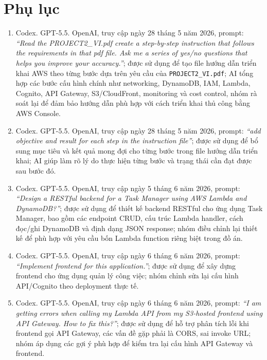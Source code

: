 \section{Phụ lục}

\begin{enumerate}
    \item Codex. GPT-5.5. OpenAI, truy cập ngày 28 tháng 5 năm 2026, prompt: \textit{``Read the PROJECT2\_VI.pdf create a step-by-step instruction that follows the requirements in that pdf file. Ask me a series of yes/no questions that helps you improve your accuracy.''}; được sử dụng để tạo file hướng dẫn triển khai AWS theo từng bước dựa trên yêu cầu của \texttt{PROJECT2\_VI.pdf}; AI tổng hợp các bước cấu hình chính như networking, DynamoDB, IAM, Lambda, Cognito, API Gateway, S3/CloudFront, monitoring và cost control, nhóm rà soát lại để đảm bảo hướng dẫn phù hợp với cách triển khai thủ công bằng AWS Console.

    \item Codex. GPT-5.5. OpenAI, truy cập ngày 28 tháng 5 năm 2026, prompt: \textit{``add objective and result for each step in the instruction file''}; được sử dụng để bổ sung mục tiêu và kết quả mong đợi cho từng bước trong file hướng dẫn triển khai; AI giúp làm rõ lý do thực hiện từng bước và trạng thái cần đạt được sau bước đó.

    \item Codex. GPT-5.5. OpenAI, truy cập ngày 5 tháng 6 năm 2026, prompt: \textit{``Design a RESTful backend for a Task Manager using AWS Lambda and DynamoDB?''}; được sử dụng để thiết kế backend RESTful cho ứng dụng Task Manager, bao gồm các endpoint CRUD, cấu trúc Lambda handler, cách đọc/ghi DynamoDB và định dạng JSON response; nhóm điều chỉnh lại thiết kế để phù hợp với yêu cầu bốn Lambda function riêng biệt trong đồ án.

    \item Codex. GPT-5.5. OpenAI, truy cập ngày 6 tháng 6 năm 2026, prompt: \textit{``Implement frontend for this application.''}; được sử dụng để xây dựng frontend cho ứng dụng quản lý công việc; nhóm chỉnh sửa lại cấu hình API/Cognito theo deployment thực tế.

    \item Codex. GPT-5.5. OpenAI, truy cập ngày 6 tháng 6 năm 2026, prompt: \textit{``I am getting errors when calling my Lambda API from my S3-hosted frontend using API Gateway. How to fix this?''}; được sử dụng để hỗ trợ phân tích lỗi khi frontend gọi API Gateway, các vấn đề gặp phải là CORS, sai invoke URL; nhóm áp dụng các gợi ý phù hợp để kiểm tra lại cấu hình API Gateway và frontend.


\end{enumerate}
